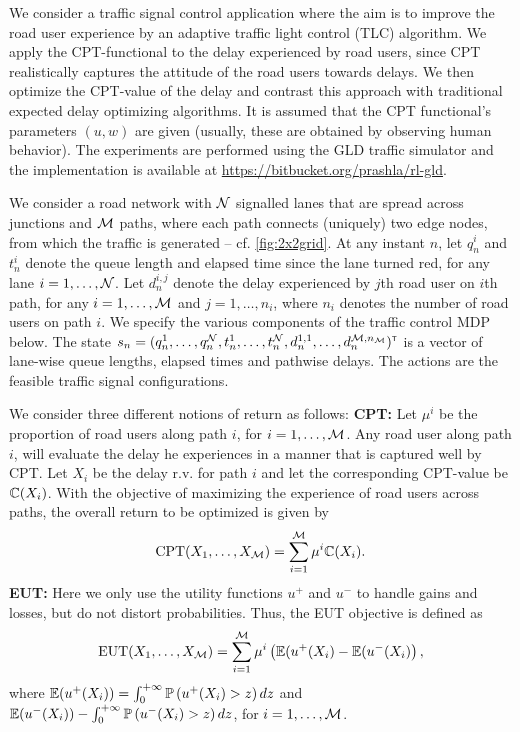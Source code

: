We consider a traffic signal control application where the aim is to improve the road user experience by an adaptive traffic light control (TLC) algorithm.
We apply the CPT-functional to the delay experienced by road users, since CPT realistically captures the attitude of the road users towards delays. We then optimize the CPT-value of the delay and contrast this approach with traditional expected delay optimizing algorithms. It is assumed that the CPT functional's parameters $(u,w)$ are given (usually, these are obtained by observing human behavior). The experiments are performed using the GLD traffic simulator \cite{GLDSim} and the implementation is available at \url{https://bitbucket.org/prashla/rl-gld}.

We consider a road network with $\mathcal{N}$ signalled lanes that are spread across junctions and $\mathcal{M}$ paths, where each path connects (uniquely) two edge nodes, from which the traffic is generated -- cf. \cref{fig:2x2grid}. 
At any instant $n$, let $q_n^i$ and $t_n^i$ denote the queue length and elapsed time since the lane turned red, for any lane $i = 1,\ldots, \mathcal{N}$. Let $d_n^{i,j}$ denote the delay experienced by $j$th road user on $i$th path, for any $i=1,\ldots,\mathcal{M}$ and $j=1,\ldots,n_i$, where $n_i$ denotes the number of road users on path $i$.
We specify the various components of the traffic control MDP below.
The state $s_n=(q_n^1,\ldots,q_n^{\mathcal{N}},t_n^1,\ldots,t_n^{\mathcal{N}},d_n^{1,1},\ldots,d_n^{\mathcal{M},n_{\mathcal{M}}})^\mathsf{\scriptscriptstyle T}$ is a vector of lane-wise queue lengths, elapsed times and pathwise delays.
The actions are the feasible traffic signal configurations. 

We consider three different notions of return as follows:
%
\textbf{CPT:} Let $\mu^i$ be the proportion of road users along path $i$, for $i=1,\ldots,\mathcal{M}$. Any road user along path $i$, will evaluate the delay he experiences in a manner that is captured well by CPT. Let $X_i$ be the delay r.v. for path $i$ and let the corresponding CPT-value be $\mathbb{C}(X_i)$. With the objective of maximizing the experience of road users across paths, the overall return to be optimized is given by
\begin{align}
\text{CPT}(X_1,\ldots,X_{\mathcal{M}}) = \sum_{i=1}^{\mathcal{M}} \mu^i \mathbb{C}(X_i).\label{eq:cpt-traffic}
\end{align}
\textbf{EUT:} Here we only use the utility functions $u^+$ and $u^-$ to handle gains and losses, but do not distort probabilities. 
Thus, the EUT objective is defined as
\begin{align*}
\text{EUT}(X_1,\ldots,X_{\mathcal{M}}) = \sum_{i=1}^{\mathcal{M}} \mu^i \left(\mathbb{E}(u^+(X_i) - \mathbb{E}(u^-(X_i)\right),
\end{align*}
where $\mathbb{E}(u^+(X_i)) = \int_0^{+\infty} \mathbb{P}\left( u^+(X_i)>z \right) dz$ and $\mathbb{E}(u^-(X_i)) - \int_0^{+\infty} \mathbb{P}\left( u^-(X_i)>z \right) dz$, for $i=1,\ldots,\mathcal{M}$.

